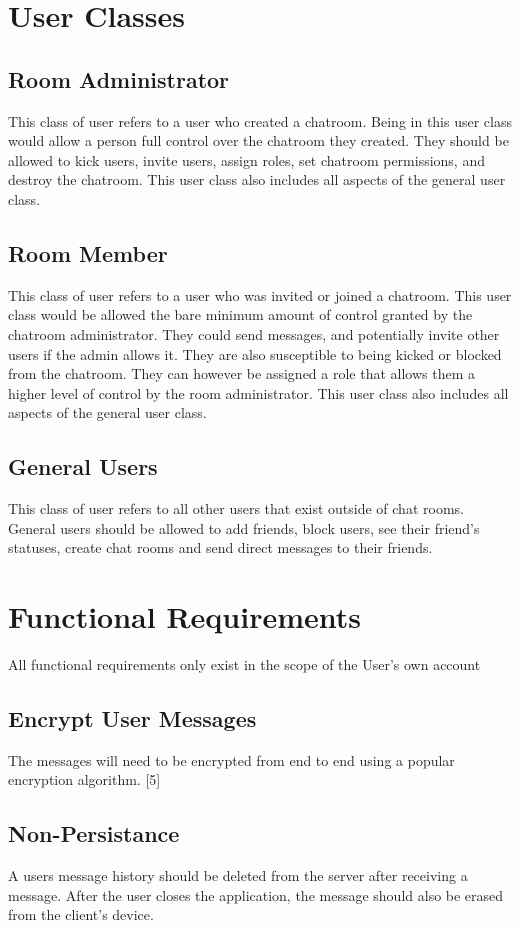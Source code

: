 \documentclass[11pt]{article}
\theoremstyle{plain}
\theoremstyle{definition}
\begin{document}
\section{User Classes}\label{sec:userclasses}

\subsection{Room Administrator}
This class of user refers to a user who created a chatroom. Being in this user class would allow a person full control over the chatroom they created. They should be allowed to kick users, invite users, assign roles, set chatroom permissions, and destroy the chatroom. This user class also includes all aspects of the general user class. 
\subsection{Room Member}
This class of user refers to a user who was invited or joined a chatroom. This user class would be allowed the bare minimum amount of control granted by the chatroom administrator. They could send messages, and potentially invite other users if the admin allows it. They are also susceptible to being kicked or blocked from the chatroom. They can however be assigned a role that allows them a higher level of control by the room administrator.  This user class also includes all aspects of the general user class. 
\subsection{General Users}
This class of user refers to all other users that exist outside of chat rooms. General users should be allowed to add friends, block users, see their friend's statuses, create chat rooms and send direct messages to their friends.

\section{Functional Requirements}\label{sec:funcrequirements}
All functional requirements only exist in the scope of the User's own account
\subsection{Encrypt User Messages}
The messages will need to be encrypted from end to end using a popular encryption algorithm. [5]
\subsection{Non-Persistance}
A users message history should be deleted from the server after receiving a message. After the user closes the application, the message should also be erased from the client's device.
\end{document}
